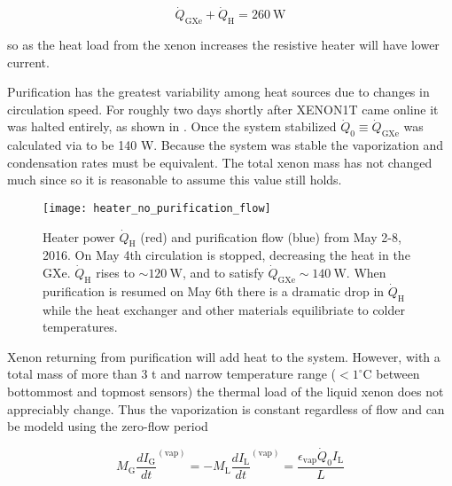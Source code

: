 \begin{equation}
\dot{Q}_{\mathrm{GXe}} + \dot{Q}_{\mathrm{H}} = 260\ \mathrm{W}
\label{eq:electron_lifetime_model_vap_and_cond_heat_gxe}
\end{equation}

\noindent so as the heat load from the xenon increases the resistive heater will have lower current.

Purification has the greatest variability among heat sources due to changes in circulation speed.  For roughly two days shortly after
XENON1T came online it was halted entirely, as shown in .  Once the system
stabilized $\dot{Q}_0 \equiv \dot{Q}_{\mathrm{GXe}}$ was calculated via
 to be 140 W.  Because the system was stable the vaporization and condensation
rates must be equivalent.  The total xenon mass has not changed much since so it is reasonable to assume this value still holds.

\begin{figure}
\centering
\texttt{[image: heater\_no\_purification\_flow]}
\caption{Heater power $\dot{Q}_{\mathrm{H}}$ (red) and purification flow (blue) from May 2-8, 2016.  On May 4th circulation is stopped,
decreasing the heat in the GXe.  $\dot{Q}_{\mathrm{H}}$ rises to ${\sim}120\ \mathrm{W}$, and to satisfy
 $\dot{Q}_{\mathrm{GXe}} \sim 140\ \mathrm{W}$.  When purification is resumed on
May 6th
there is a dramatic drop in $\dot{Q}_{\mathrm{H}}$ while the heat exchanger and other materials equilibriate to colder temperatures.}
\label{fig:electron_lifetime_model_vap_and_cond_no_flow}
\end{figure}

Xenon returning from purification will add heat to the system.  However, with a total mass of more than 3 t and
narrow temperature range ($< 1^{\circ}\mathrm{C}$ between bottommost and topmost sensors) the thermal load of the liquid xenon does not
appreciably change.  Thus the vaporization is constant regardless of flow and can be modeld using the zero-flow period

\begin{equation}
M_{\mathrm{G}} \frac{dI_{\mathrm{G}}}{dt}^{(\mathrm{vap})} = -M_{\mathrm{L}} \frac{dI_{\mathrm{L}}}{dt}^{(\mathrm{vap})} =
\frac{\epsilon_{\mathrm{vap}} \dot{Q}_0 I_{\mathrm{L}}}{L}
\end{equation}

